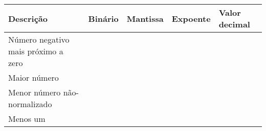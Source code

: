 \begin{enumerate}[resume]
    \begin{table}[H]
        \begin{tabular}{|l|l|l|l|l|}
            \hline
            \textbf{Descrição}  & 
            \textbf{Binário}    & 
            \textbf{Mantissa}   &
            \textbf{Expoente}   &
            \textbf{Valor decimal} \\\hline
            Número negativo mais próximo a zero & & & & \\\hline
            Maior número & & & & \\\hline
            Menor número não-normalizado & & & & \\\hline
            Menos um & & & & \\
            \hline
        \end{tabular}
    \end{table}

\end{enumerate}
